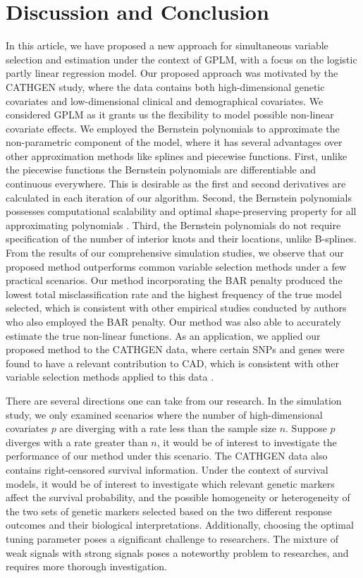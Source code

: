 \documentclass[11pt]{article}
\begin{document}
\section{Discussion and Conclusion} \label{sec:diss}
In this article, we have proposed a new approach for simultaneous variable selection and estimation under the context of GPLM, with a focus on the logistic partly linear regression model. Our proposed approach was motivated by the CATHGEN study, where the data contains both high-dimensional genetic covariates and low-dimensional clinical and demographical covariates. We considered GPLM as it grants us the flexibility to model possible non-linear covariate effects. We employed the Bernstein polynomials to approximate the non-parametric component of the model, where it has several advantages over other approximation methods like splines and piecewise functions. First, unlike the piecewise functions the Bernstein polynomials are differentiable and continuous everywhere. This is desirable as the first and second derivatives are calculated in each iteration of our algorithm. Second, the Bernstein polynomials possesses computational scalability and optimal shape-preserving property for all approximating polynomials \citep{carnicer1993shape}. Third, the Bernstein polynomials do not require specification of the number of interior knots and their locations, unlike B-splines. From the results of our comprehensive simulation studies, we observe that our proposed method outperforms common variable selection methods under a few practical scenarios. Our method incorporating the BAR penalty produced the lowest total misclassification rate and the highest frequency of the true model selected, which is consistent with other empirical studies conducted by authors who also employed the BAR penalty\citep{dai2018broken,zhao2019simultaneous,sun2022broken}. Our method was also able to accurately estimate the true non-linear functions. As an application, we applied our proposed method to the CATHGEN data, where certain SNPs and genes were found to have a relevant contribution to CAD, which is consistent with other variable selection methods applied to this data \citep{li2022bayesian, dai2023bayesian}. 
 
There are several directions one can take from our research. In the simulation study, we only examined scenarios where the number of high-dimensional covariates $p$ are diverging with a rate less than the sample size $n$. Suppose $p$ diverges with a rate greater than $n$, it would be of interest to investigate the performance of our method under this scenario. The CATHGEN data also contains right-censored survival information. Under the context of survival models, it would be of interest to investigate which relevant genetic markers affect the survival probability, and the possible homogeneity or heterogeneity of the two sets of genetic markers selected based on the two different response outcomes and their biological interpretations. Additionally, choosing the optimal tuning parameter poses a significant challenge to researchers. The mixture of weak signals with strong signals poses a noteworthy problem to researches, and requires more thorough investigation.
\end{document}
